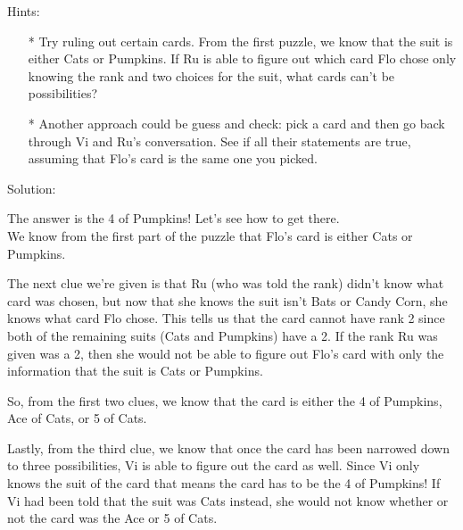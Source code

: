 


Hints:
\begin{itemize}
\item[*] Try ruling out certain cards. From the first puzzle, we know that the suit is either Cats or Pumpkins. If Ru is able to figure out which card Flo chose only knowing the rank and two choices for the suit, what cards can't be possibilities?
\item[*] Another approach could be guess and check: pick a card and then go back through Vi and Ru's conversation. See if all their statements are true, assuming that Flo's card is the same one you picked.
\end{itemize}


Solution:

The answer is the 4 of Pumpkins! Let's see how to get there.\\

We know from the first part of the puzzle that Flo's card is either Cats or Pumpkins.

The next clue we're given is that Ru (who was told the rank) didn't know what card was chosen, but now that she knows the suit isn't Bats or Candy Corn, she knows what card Flo chose. This tells us that the card cannot have rank 2 since both of the remaining suits (Cats and Pumpkins) have a 2. If the rank Ru was given was a 2, then she would not be able to figure out Flo's card with only the information that the suit is Cats or Pumpkins.

So, from the first two clues, we know that the card is either the 4 of Pumpkins, Ace of Cats, or 5 of Cats.

Lastly, from the third clue, we know that once the card has been narrowed down to three possibilities, Vi is able to figure out the card as well. Since Vi only knows the suit of the card that means the card has to be the 4 of Pumpkins! If Vi had been told that the suit was Cats instead, she would not know whether or not the card was the Ace or 5 of Cats.\\
